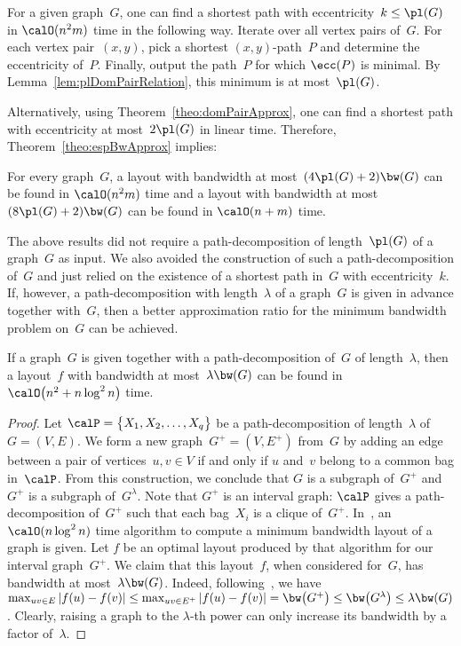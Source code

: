 For a given graph~$G$, one can find a shortest path with eccentricity~$k \leq \pl(G)$ in $\calO(n^2 m)$ time in the following way.
Iterate over all vertex pairs of~$G$.
For each vertex pair~$(x, y)$, pick a shortest $(x,y)$-path~$P$ and determine the eccentricity of~$P$.
Finally, output the path~$P$ for which $\ecc(P)$ is minimal.
By Lemma~\ref{lem:plDomPairRelation}, this minimum is at most~$\pl(G)$.

Alternatively, using Theorem~\ref{theo:domPairApprox}, one can find a shortest path with eccentricity at most~$2 \pl(G)$ in linear time.
Therefore, Theorem~\ref{theo:espBwApprox} implies:

\begin{corollary}
    \label{cor:appr-bw-pl}
For every graph~\( G \), a layout with bandwidth at most~\( (4 \pl(G) + 2) \bw(G) \) can be found in \( \calO(n^2 m) \) time and a layout with bandwidth at most~\( (8 \pl(G) + 2) \bw(G) \) can be found in \( \calO(n + m) \) time.
\end{corollary}

The above results did not require a path-decomposition of length~$\pl(G)$ of a graph~$G$ as input.
We also avoided the construction of such a path-decomposition of~$G$ and just relied on the existence of a shortest path in~$G$ with eccentricity~$k$.
If, however, a path-decomposition with length~$\lambda$ of a graph~$G$ is given in advance together with~$G$, then a better approximation ratio for the minimum bandwidth problem on~$G$ can be achieved.

\begin{theorem}
    \label{theo:plBwApprox}
If a graph~\( G \) is given together with a path-decomposition of~\( G \) of length~\( \lambda \), then a layout~\( f \) with bandwidth at most~\( \lambda \bw(G) \) can be found in \( \calO \! \left ( n^2 + n \log^2 n \right ) \) time.
\end{theorem}

\begin{proof}
Let $\calP = \big \{ X_1, X_2, \ldots, X_q \big \}$ be a path-decomposition of length~$\lambda$ of~$G = (V, E)$.
We form a new graph~$G^+ = (V, E^+)$ from~$G$ by adding an edge between a pair of vertices~$u, v \in V$ if and only if $u$ and~$v$ belong to a common bag in~$\calP$.
From this construction, we conclude that $G$ is a subgraph of~$G^+$ and $G^+$ is a subgraph of~$G^{\lambda}$.
Note that $G^+$ is an interval graph:
$\calP$ gives a path-decomposition of~$G^+$ such that each bag~$X_i$ is a clique of~$G^+$.
In~\cite{Sprague1994}, an $\calO(n \log^2 n)$ time algorithm to compute a minimum bandwidth layout of a graph is given.
Let $f$ be an optimal layout produced by that algorithm for our interval graph~$G^+$.
We claim that this layout~$f$, when considered for~$G$, has bandwidth at most~$\lambda \bw(G)$.
Indeed, following~\cite{KlokKratMuel1999}, we have $\max_{uv \in E} |f(u) - f(v)| \leq \max_{uv \in E^+} |f(u) - f(v)| = \bw \big( G^+ \big) \leq \bw \big( G^\lambda \big) \leq \lambda \bw(G)$.
Clearly, raising a graph to the $\lambda$-th power can only increase its bandwidth by a factor of~$\lambda$.
\end{proof}

